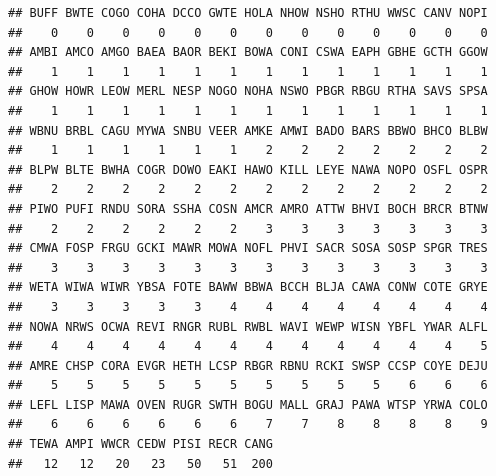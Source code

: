 \documentclass[12pt,]{book}
\newenvironment{Shaded}{\begin{snugshade}}{\end{snugshade}}
\newcommand{\CommentTok}[1]{\textcolor[rgb]{0.56,0.35,0.01}{\textit{#1}}}
\newcommand{\DecValTok}[1]{\textcolor[rgb]{0.00,0.00,0.81}{#1}}
\newcommand{\KeywordTok}[1]{\textcolor[rgb]{0.13,0.29,0.53}{\textbf{#1}}}
\newcommand{\NormalTok}[1]{#1}
\newcommand{\OperatorTok}[1]{\textcolor[rgb]{0.81,0.36,0.00}{\textbf{#1}}}
\newcommand{\StringTok}[1]{\textcolor[rgb]{0.31,0.60,0.02}{#1}}
\begin{document}
\begin{verbatim}
## BUFF BWTE COGO COHA DCCO GWTE HOLA NHOW NSHO RTHU WWSC CANV NOPI 
##    0    0    0    0    0    0    0    0    0    0    0    0    0 
## AMBI AMCO AMGO BAEA BAOR BEKI BOWA CONI CSWA EAPH GBHE GCTH GGOW 
##    1    1    1    1    1    1    1    1    1    1    1    1    1 
## GHOW HOWR LEOW MERL NESP NOGO NOHA NSWO PBGR RBGU RTHA SAVS SPSA 
##    1    1    1    1    1    1    1    1    1    1    1    1    1 
## WBNU BRBL CAGU MYWA SNBU VEER AMKE AMWI BADO BARS BBWO BHCO BLBW 
##    1    1    1    1    1    1    2    2    2    2    2    2    2 
## BLPW BLTE BWHA COGR DOWO EAKI HAWO KILL LEYE NAWA NOPO OSFL OSPR 
##    2    2    2    2    2    2    2    2    2    2    2    2    2 
## PIWO PUFI RNDU SORA SSHA COSN AMCR AMRO ATTW BHVI BOCH BRCR BTNW 
##    2    2    2    2    2    2    3    3    3    3    3    3    3 
## CMWA FOSP FRGU GCKI MAWR MOWA NOFL PHVI SACR SOSA SOSP SPGR TRES 
##    3    3    3    3    3    3    3    3    3    3    3    3    3 
## WETA WIWA WIWR YBSA FOTE BAWW BBWA BCCH BLJA CAWA CONW COTE GRYE 
##    3    3    3    3    3    4    4    4    4    4    4    4    4 
## NOWA NRWS OCWA REVI RNGR RUBL RWBL WAVI WEWP WISN YBFL YWAR ALFL 
##    4    4    4    4    4    4    4    4    4    4    4    4    5 
## AMRE CHSP CORA EVGR HETH LCSP RBGR RBNU RCKI SWSP CCSP COYE DEJU 
##    5    5    5    5    5    5    5    5    5    5    6    6    6 
## LEFL LISP MAWA OVEN RUGR SWTH BOGU MALL GRAJ PAWA WTSP YRWA COLO 
##    6    6    6    6    6    6    7    7    8    8    8    8    9 
## TEWA AMPI WWCR CEDW PISI RECR CANG 
##   12   12   20   23   50   51  200
\end{verbatim}

\begin{Shaded}
\end{Shaded}
\end{document}

